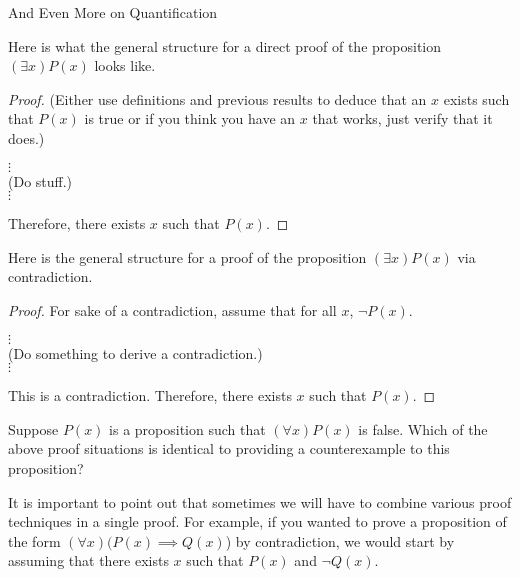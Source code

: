 \begin{section}{And Even More on Quantification}
\begin{skeleton}
Here is what the general structure for a direct proof of the proposition $(\exists x)P(x)$ looks like.

\bigskip

\begin{textbox}
\begin{proof}
(Either use definitions and previous results to deduce that an $x$ exists such that $P(x)$ is true or if you think you have an $x$ that works, just verify that it does.)
\begin{center}
$\vdots$\\
(Do stuff.)\\
$\vdots$
\end{center}Therefore, there exists $x$ such that $P(x)$.
\end{proof}
\end{textbox}

\end{skeleton}

\begin{skeleton}
Here is the general structure for a proof of the proposition $(\exists x)P(x)$ via contradiction.

\bigskip

\begin{textbox}
\begin{proof}
For sake of a contradiction, assume that for all $x$, $\neg P(x)$.
\begin{center}
$\vdots$\\
(Do something to derive a contradiction.)\\
$\vdots$
\end{center}
\noindent This is a contradiction.  Therefore, there exists $x$ such that $P(x)$.
\end{proof}
\end{textbox}

\end{skeleton}

\begin{question}
Suppose $P(x)$ is a proposition such that $(\forall x)P(x)$ is false.  Which of the above proof situations is identical to providing a counterexample to this proposition?
\end{question}

\begin{remark}
It is important to point out that sometimes we will have to combine various proof techniques in a single proof.  For example, if you wanted to prove a proposition of the form $(\forall x)(P(x) \implies Q(x)$) by contradiction, we would start by assuming that there exists $x$ such that $P(x)$ and $\neg Q(x)$.
\end{remark}


\end{section}
